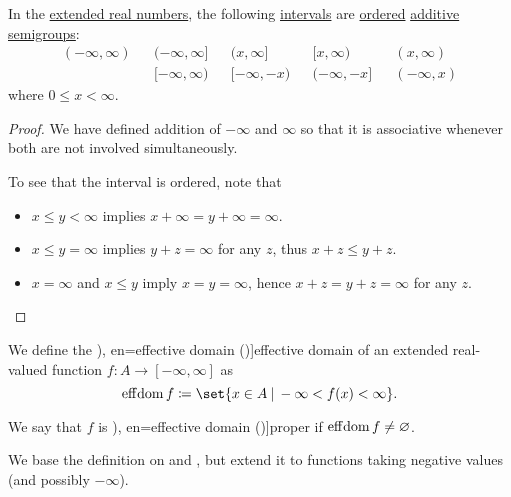 \begin{proposition}\label{thm:extended_real_semigroup}
  In the \hyperref[def:extended_real_numbers]{extended real numbers}, the following \hyperref[def:order_interval/closed]{intervals} are \hyperref[def:ordered_semigroup]{ordered} \hyperref[con:additive_semigroup]{additive semigroups}:
  \begin{align*}
    (-\infty, \infty) && (-\infty, \infty] && (x, \infty]   && [x, \infty)    && (x, \infty) \\
                      && [-\infty, \infty) && [-\infty, -x) && (-\infty, -x] && (-\infty, x)
  \end{align*}
  where \( 0 \leq x < \infty \).
\end{proposition}
\begin{proof}
  We have defined addition of \( -\infty \) and \( \infty \) so that it is associative whenever both are not involved simultaneously.

  To see that the interval is ordered, note that
  \begin{itemize}
    \item \( x \leq y < \infty \) implies \( x + \infty = y + \infty = \infty \).
    \item \( x \leq y = \infty \) implies \( y + z = \infty \) for any \( z \), thus \( x + z \leq y + z \).
    \item \( x = \infty \) and \( x \leq y \) imply \( x = y = \infty \), hence \( x + z = y + z = \infty \) for any \( z \).
  \end{itemize}
\end{proof}

\begin{definition}\label{def:effective_domain}\mimprovised
  We define the \term[ru=эффективное множество (\cite[50]{ПоловинкинБалашов2007ВыпуклыйАнализ}), en=effective domain (\cite[30]{Clarke2013OptimalControl})]{effective domain} of an extended real-valued function \( f: A \to [-\infty, \infty] \) as
  \begin{equation}\label{eq:def:effective_domain}
    \eff\dom f \coloneqq \set{ x \in A \given -\infty < f(x) < \infty }.
  \end{equation}

  We say that \( f \) is \term[ru=эффективное множество (\cite[50]{ПоловинкинБалашов2007ВыпуклыйАнализ}), en=effective domain (\cite[30]{Clarke2013OptimalControl})]{proper} if \( \operatorname*{eff\negthinspace\operatorname{dom}} f \neq \varnothing \).
\end{definition}
\begin{comments}
  \item We base the definition on \cite[30]{Clarke2013OptimalControl} and \cite[50]{ПоловинкинБалашов2007ВыпуклыйАнализ}, but extend it to functions taking negative values (and possibly \( -\infty \)).
\end{comments}
